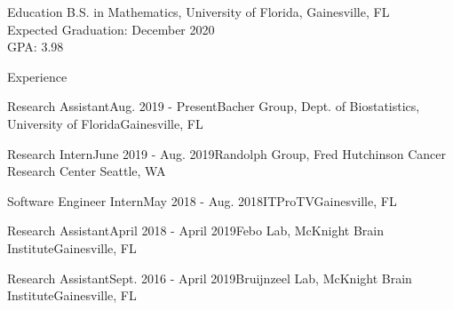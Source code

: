 \documentclass{resume}
\begin{document}
 
 
\begin{rSection}{Education} 
B.S. in Mathematics, University of Florida, Gainesville, FL \\
Expected Graduation: December 2020 \\
GPA: 3.98

\end{rSection}


\begin{rSection}{Experience}

\begin{rSubsectionEmpty}{Research Assistant}{Aug. 2019 - Present}{Bacher Group, Dept. of
Biostatistics, University of Florida}{Gainesville, FL}
\end{rSubsectionEmpty}

\begin{rSubsectionEmpty}{Research Intern}{June 2019 - Aug. 2019}{Randolph
    Group, Fred Hutchinson Cancer Research Center}
{Seattle, WA}
\end{rSubsectionEmpty}

\begin{rSubsectionEmpty}{Software Engineer Intern}{May 2018 - Aug. 2018}{ITProTV}{Gainesville, FL}
\end{rSubsectionEmpty} 

\begin{rSubsectionEmpty}{Research Assistant}{April 2018 - April 2019}{Febo Lab, McKnight Brain Institute}{Gainesville, FL}
\end{rSubsectionEmpty}


\begin{rSubsectionEmpty}{Research Assistant}{Sept. 2016 - April 2019}{Bruijnzeel Lab, McKnight Brain Institute}{Gainesville, FL}
     \end{rSubsectionEmpty}
     
\end{rSection}
\end{document}
